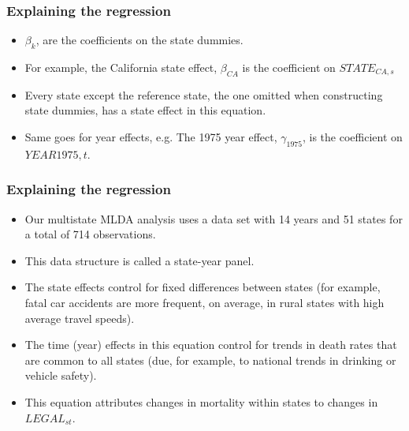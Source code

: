 \documentclass{beamer}
\begin{document}
\begin{frame}
\frametitle{Explaining the regression}
	\begin{itemize}
		\item $\beta_k$, are the coefficients on the state dummies. 
		\item For example, the California state effect, $\beta_{CA}$ is the coefficient on $STATE_{CA,s}$
		\item Every state except the reference state, the one omitted when constructing state dummies, has a state effect in this equation.
		\item Same goes for year effects, e.g. The 1975 year effect, $\gamma_{1975}$, is the coefficient on $YEAR{1975, t}$.
\end{itemize}

\end{frame}

\begin{frame}
\frametitle{Explaining the regression}
	\begin{itemize}
		\item Our multistate MLDA analysis uses a data set with 14 years and 51 states for a total of 714 observations. 			
		\item This data structure is called a state-year panel.
		\item The state effects control for fixed differences between states (for example, fatal car accidents are more frequent, on average, in rural states with high average travel speeds). 
		\item The time (year) effects in this equation control for trends in death rates that are common to all states (due, for example, to national trends in drinking or vehicle safety).
		\item This equation attributes changes in mortality within states to changes in $LEGAL_{st}$.

	\end{itemize}
\end{frame}

\end{document}
